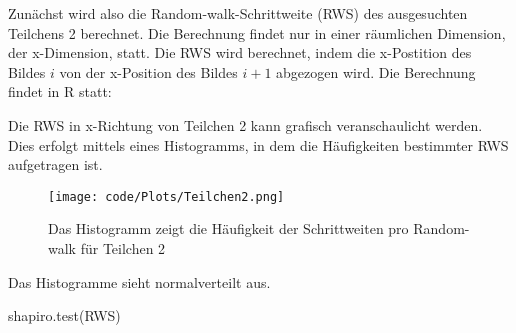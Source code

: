 \documentclass[class=article, crop=false]{standalone}
\newenvironment{Shaded}{\begin{snugshade}}{\end{snugshade}}
\newcommand{\CommentTok}[1]{\textcolor[rgb]{0.56,0.35,0.01}{\textit{#1}}}
\newcommand{\ControlFlowTok}[1]{\textcolor[rgb]{0.13,0.29,0.53}{\textbf{#1}}}
\newcommand{\DecValTok}[1]{\textcolor[rgb]{0.00,0.00,0.81}{#1}}
\newcommand{\DocumentationTok}[1]{\textcolor[rgb]{0.56,0.35,0.01}{\textbf{\textit{#1}}}}
\newcommand{\FloatTok}[1]{\textcolor[rgb]{0.00,0.00,0.81}{#1}}
\newcommand{\FunctionTok}[1]{\textcolor[rgb]{0.00,0.00,0.00}{#1}}
\newcommand{\NormalTok}[1]{#1}
\newcommand{\OtherTok}[1]{\textcolor[rgb]{0.56,0.35,0.01}{#1}}
\newcommand{\SpecialCharTok}[1]{\textcolor[rgb]{0.00,0.00,0.00}{#1}}
\newcommand{\StringTok}[1]{\textcolor[rgb]{0.31,0.60,0.02}{#1}}
\begin{document}
Zunächst wird also die Random-walk-Schrittweite (RWS) des ausgesuchten
Teilchens 2 berechnet. Die Berechnung findet nur in einer räumlichen
Dimension, der x-Dimension, statt. Die RWS wird berechnet, indem die
x-Postition des Bildes \(i\) von der x-Position des Bildes \(i+1\)
abgezogen wird. Die Berechnung findet in R statt:

\begin{Shaded}
\end{Shaded}

Die RWS in x-Richtung von Teilchen 2 kann grafisch veranschaulicht
werden. Dies erfolgt mittels eines Histogramms, in dem die Häufigkeiten
bestimmter RWS aufgetragen ist.

\begin{figure}
\centering
\texttt{[image: code/Plots/Teilchen2.png]}
\caption{Das Histogramm zeigt die Häufigkeit der Schrittweiten pro
Random-walk für Teilchen 2}
\end{figure}

Das Histogramme sieht normalverteilt aus.

\begin{Shaded}
\begin{Highlighting}[]
\FunctionTok{shapiro.test}\NormalTok{(RWS)}
\end{Highlighting}
\end{Shaded}
\end{document}
